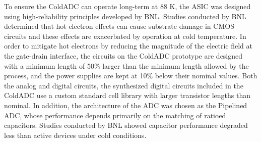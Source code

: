 To ensure the ColdADC can operate long-term at 88 K, the ASIC was designed using high-reliability principles developed by BNL. Studies conducted by BNL determined that hot electron effects can cause substrate damage in CMOS circuits and these effects are exacerbated by operation at cold temperature. In order to mitigate hot electrons by reducing the magnitude of the electric field at the gate-drain interface, the circuits on the ColdADC prototype are designed with a minimum length of 50\% larger than the minimum length allowed by the process, and the power supplies are kept at 10\% below their nominal values. Both the analog and digital circuits, the synthesized digital circuits included in the ColdADC use a custom standard cell library with larger transistor lengths than nominal. In addition, the architecture of the ADC was chosen as the Pipelined ADC, whose performance depends primarily on the matching of ratioed capacitors. Studies conducted by BNL showed capacitor performance degraded less than active devices under cold conditions. 
